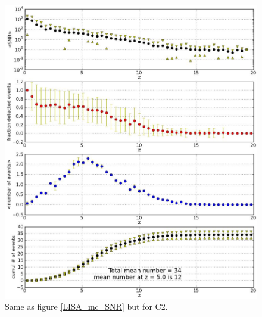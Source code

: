 \documentclass{iopart}
\begin{document}


\begin{figure}[H]
\center
   \includegraphics[width=1\textwidth]{FigSMBHPhenomAEI/C2_mc_SNRs.eps}
\caption{Same as figure \ref{LISA_mc_SNR} but for C2.
\label{C2_mc_SNR} } 
\end{figure}






\end{document}
